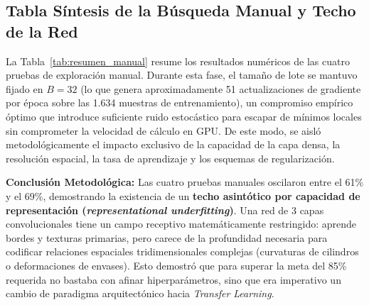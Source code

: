 \documentclass[11pt,a4paper]{article}
\begin{document}
\subsection{Tabla Síntesis de la Búsqueda Manual y Techo de la Red}
La Tabla~\ref{tab:resumen_manual} resume los resultados numéricos de las cuatro pruebas de exploración manual. Durante esta fase, el tamaño de lote se mantuvo fijado en $B=32$ (lo que genera aproximadamente 51 actualizaciones de gradiente por época sobre las 1.634 muestras de entrenamiento), un compromiso empírico óptimo que introduce suficiente ruido estocástico para escapar de mínimos locales sin comprometer la velocidad de cálculo en GPU. De este modo, se aisló metodológicamente el impacto exclusivo de la capacidad de la capa densa, la resolución espacial, la tasa de aprendizaje y los esquemas de regularización.

\begin{table}[H]
\centering
\caption{Comparativa cuantitativa de las cuatro configuraciones manuales de la red propia \texttt{WasteCNN}.}
\label{tab:resumen_manual}
\renewcommand{\arraystretch}{1.2}
\small
{}
\end{table}

\textbf{Conclusión Metodológica:} Las cuatro pruebas manuales oscilaron entre el 61\% y el 69\%, demostrando la existencia de un \textbf{techo asintótico por capacidad de representación (\textit{representational underfitting})}. Una red de 3 capas convolucionales tiene un campo receptivo matemáticamente restringido: aprende bordes y texturas primarias, pero carece de la profundidad necesaria para codificar relaciones espaciales tridimensionales complejas (curvaturas de cilindros o deformaciones de envases). Esto demostró que para superar la meta del 85\% requerida no bastaba con afinar hiperparámetros, sino que era imperativo un cambio de paradigma arquitectónico hacia \textit{Transfer Learning}.
\end{document}
